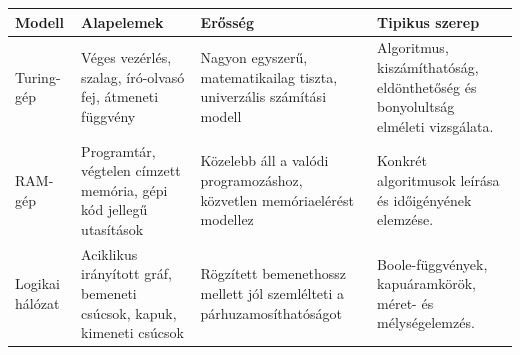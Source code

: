 \begin{tabularx}{\textwidth}{L{28mm}L{32mm}L{46mm}X}
\toprule
\textbf{Modell} & \textbf{Alapelemek} & \textbf{Erősség} & \textbf{Tipikus szerep} \\
\midrule
Turing-gép & Véges vezérlés, szalag, író-olvasó fej, átmeneti függvény & Nagyon egyszerű, matematikailag tiszta, univerzális számítási modell & Algoritmus, kiszámíthatóság, eldönthetőség és bonyolultság elméleti vizsgálata. \\
RAM-gép & Programtár, végtelen címzett memória, gépi kód jellegű utasítások & Közelebb áll a valódi programozáshoz, közvetlen memóriaelérést modellez & Konkrét algoritmusok leírása és időigényének elemzése. \\
Logikai hálózat & Aciklikus irányított gráf, bemeneti csúcsok, kapuk, kimeneti csúcsok & Rögzített bemenethossz mellett jól szemlélteti a párhuzamosíthatóságot & Boole-függvények, kapuáramkörök, méret- és mélységelemzés. \\
\bottomrule
\end{tabularx}
